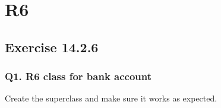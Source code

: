 \documentclass[
]{book}
\begin{document}
\hypertarget{r6}{%
\chapter{R6}\label{r6}}

\hypertarget{exercise-14.2.6}{%
\section{Exercise 14.2.6}\label{exercise-14.2.6}}

\hypertarget{q1.-r6-class-for-bank-account}{%
\subsection*{Q1. R6 class for bank account}\label{q1.-r6-class-for-bank-account}}

Create the superclass and make sure it works as expected.
\end{document}
